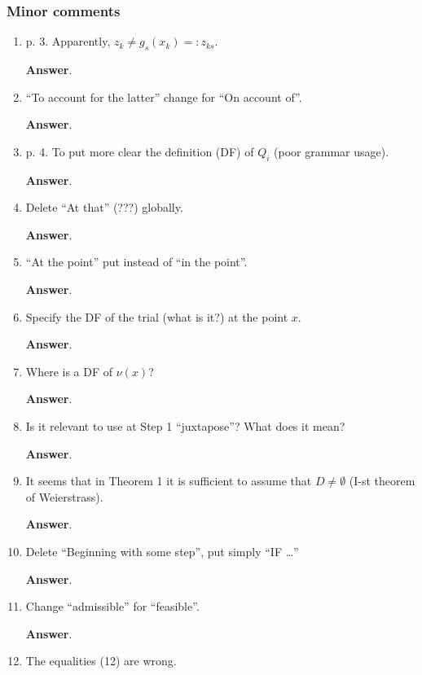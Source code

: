 \documentclass{article}%
\begin{document}
\subsubsection*{Minor comments}

\begin{enumerate}
\item p. 3. Apparently, $z_k\neq g_s(x_k ) =:z_{ks}$.

\textbf{Answer}.

\item  “To account for the latter” change for “On account of”.

\textbf{Answer}.

\item  p. 4. To put more clear the definition (DF) of $Q_i$ (poor grammar usage).

\textbf{Answer}.

\item  Delete “At that” (???) globally.

\textbf{Answer}.

\item “At the point” put instead of “in the point”.

\textbf{Answer}.

\item  Specify the DF of the trial (what is it?) at the point $x$.

\textbf{Answer}.

\item  Where is a DF of $\nu(x)$?

\textbf{Answer}.

\item  Is it relevant to use at Step 1 “juxtapose”? What does it mean?

\textbf{Answer}.

\item  It seems that in Theorem 1 it is sufficient to assume that $D\neq\emptyset$ (I-st theorem of Weierstrass).

\textbf{Answer}.

\item  Delete “Beginning with some step”, put simply “IF …”

\textbf{Answer}.

\item  Change “admissible” for “feasible”.

\textbf{Answer}.

\item  The equalities (12) are wrong.


\end{enumerate}
\end{document}

